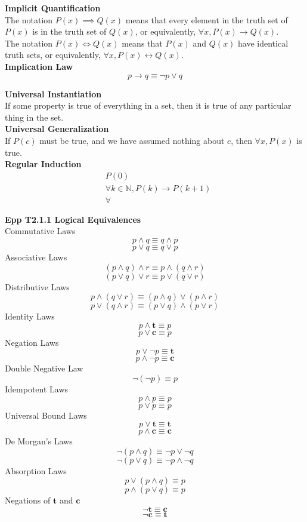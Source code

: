 \documentclass[a4paper]{article}
\newcommand{\subheading}[1]{{\scriptsize\textbf{#1}}}
\begin{document}
\begin{multicols*}{4}
\subheading{Implicit Quantification}\\
The notation $P(x) \implies Q(x)$ means that every element in the truth set of
$P(x)$ is in the truth set of $Q(x)$, or equivalently, $\forall x, P(x)
\rightarrow Q(x)$.\\

The notation $P(x) \iff Q(x)$ means that $P(x)$ and $Q(x)$ have identical truth
sets, or equivalently, $\forall x, P(x) \leftrightarrow Q(x)$.\\

\subheading{Implication Law}\\
$$p \rightarrow q \equiv \neg p \lor q$$

\subheading{Universal Instantiation}\\
If some property is true of everything in a set, then it is true of any
particular thing in the set.\\

\subheading{Universal Generalization}\\
If $P(c)$ must be true, and we have assumed nothing about $c$, then $\forall x,
P(x)$ is true.\\

\subheading{Regular Induction}\\
\begin{eqnarray*}
  &P(0) \\
  &\forall k \in \mathbb{N}, P(k) \rightarrow P(k+1) \\
  & \forall
\end{eqnarray*}

\subheading{Epp T2.1.1 Logical Equivalences}\\
Commutative Laws
  $$ p \land q \equiv q \land p $$
  $$ p \lor  q \equiv q \lor  p $$
Associative Laws
  $$ (p \land q) \land r \equiv p \land (q \land r) $$
  $$ (p \lor  q) \lor  r \equiv p \lor  (q \lor  r) $$
Distributive Laws
  $$ p \land (q \lor  r) \equiv (p \land q) \lor  (p \land r) $$
  $$ p \lor  (q \land r) \equiv (p \lor  q) \land (p \lor  r) $$
Identity Laws
  $$ p \land \textbf{t} \equiv p $$
  $$ p \lor  \textbf{c} \equiv p $$
Negation Laws
  $$ p \lor  \neg p \equiv \textbf{t} $$
  $$ p \land \neg p \equiv \textbf{c} $$
Double Negative Law
  $$ \neg ( \neg p ) \equiv p $$
Idempotent Laws
  $$ p \land p \equiv p $$
  $$ p \lor  p \equiv p $$
Universal Bound Laws
  $$ p \lor  \textbf{t} \equiv \textbf{t} $$
  $$ p \land \textbf{c} \equiv \textbf{c} $$
De Morgan's Laws
  $$ \neg ( p \land q ) \equiv \neg p \lor  \neg q $$
  $$ \neg ( p \lor  q ) \equiv \neg p \land \neg q $$
Absorption Laws
  $$ p \lor  (p \land q) \equiv p $$
  $$ p \land (p \lor  q) \equiv p $$
Negations of $\textbf{t}$ and $\textbf{c}$
  $$ \neg \textbf{t} \equiv \textbf{c} $$
  $$ \neg \textbf{c} \equiv \textbf{t} $$


\end{multicols*}
\end{document}
